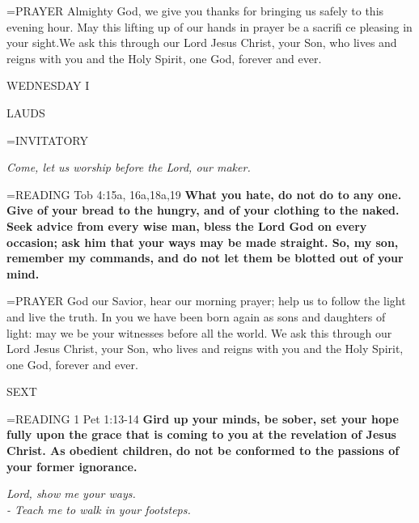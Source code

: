 \hangindent=\parindent \small{PRAYER  Almighty God, we give you thanks for bringing us safely to}
this evening hour. May this lifting up of our hands in prayer be a
sacrifi ce pleasing in your sight.We ask this through our Lord Jesus
Christ, your Son, who lives and reigns with you and the Holy Spirit,
one God, forever and ever.

\begin{center}
\normalsize WEDNESDAY I
\end{center}

\begin{flushleft}\normalsize LAUDS\\\end{flushleft}

\hangindent=\parindent \small{INVITATORY}
\begin{center}
\textit{Come, let us worship before the Lord, our maker.\\}
\end{center}

\hangindent=\parindent \small{READING} Tob 4:15a, 16a,18a,19 \textbf{What you hate, do not do to any one.  Give of your bread to the hungry, and of your clothing to the naked. Seek advice from every wise man, bless the Lord God on every occasion; ask him that your ways may be made straight. So, my son, remember my commands, and do not let them be blotted out of your mind.\\}

\hangindent=\parindent \small{PRAYER  God our Savior, hear our morning prayer; help us to follow the light and live the truth. In you we have been born again as sons and daughters of light: may we be your witnesses before all the world.  We ask this through our Lord Jesus Christ, your Son, who lives and reigns with you and the Holy Spirit, one God, forever and ever.}

\begin{flushleft}\normalsize SEXT\\\end{flushleft}

\hangindent=\parindent \small{READING} 1 Pet 1:13-14 \textbf{Gird up your minds, be sober, set your hope fully upon the grace that is coming to you at the revelation of Jesus Christ. As obedient children, do not be conformed to the passions of your former ignorance.}

\begin{center}
\textit{Lord, show me your ways.\\
- Teach me to walk in your footsteps.}
\end{center}

